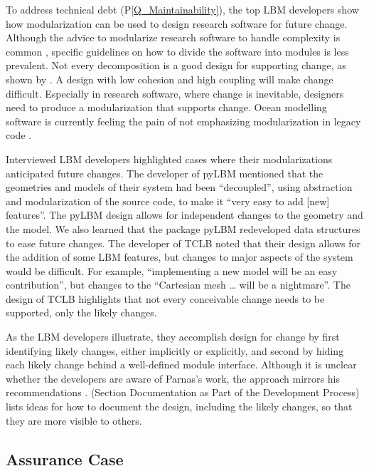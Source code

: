 \documentclass[final, 3p, times, authoryear]{elsarticle}
\newcommand{\ppref}[1]{P\ref{#1}}
\begin{document}
To address technical debt (\ppref{Q_Maintainability}), the top LBM developers show how
modularization can be used to design research software for future change.
Although the advice to modularize research software to handle complexity is
common \citep{WilsonEtAl2014, StewartEtAl2017, Storer2017}, specific guidelines
on how to divide the software into modules is less prevalent.  Not every
decomposition is a good design for supporting change, as shown by
\citet{Parnas1972a}.  A design with low cohesion and high coupling \citep[p.\
48]{GhezziEtAl2003} will make change difficult. Especially in research software,
where change is inevitable, designers need to produce a modularization that
supports change. Ocean modelling software is currently feeling the pain of
not emphasizing modularization in legacy code \citep{JungEtAl2022}.

Interviewed LBM developers highlighted cases where their modularizations
anticipated future changes.  The developer of pyLBM mentioned that the
geometries and models of their system had been ``decoupled'', using abstraction
and modularization of the source code, to make it ``very easy to add [new]
features''.  The pyLBM design allows for independent changes to the geometry and
the model.  We also learned that the package pyLBM redeveloped data structures
to ease future changes. The developer of TCLB noted that their design allows for
the addition of some LBM features, but changes to major aspects of the system
would be difficult. For example, ``implementing a new model will be an easy
contribution'', but changes to the ``Cartesian mesh … will be a nightmare''. The
design of TCLB highlights that not every conceivable change needs to be
supported, only the likely changes.  

As the LBM developers illustrate, they accomplish design for change by first
identifying likely changes, either implicitly or explicitly, and second by
hiding each likely change behind a well-defined module interface.  Although it
is unclear whether the developers are aware of Parnas's work, the approach
mirrors his recommendations \citep{Parnas1972a}. \citet{SmithEtAl2022} (Section
Documentation as Part of the Development Process) lists ideas for how to
document the design, including the likely changes, so that they are more visible
to others.

\subsection{Assurance Case} \label{AssuranceCases}
\end{document}
